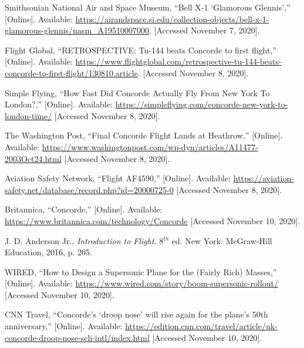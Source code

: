 \documentclass[a4paper,11pt]{article}
\begin{document}

\renewcommand{\bibname}{\begin{huge}References\end{huge}}
\begin{thebibliography}


{Smithsonian National Air and Space Museum},
{``Bell X-1 `Glamorous Glennis',''}
[Online]. Available:
\url{https://airandspace.si.edu/collection-objects/bell-x-1-glamorous-glennis/nasm_A19510007000}.
[Accessed November 7, 2020].

{Flight Global},
{``RETROSPECTIVE: Tu-144 beats Concorde to first flight,''}
[Online]. Available:
\url{https://www.flightglobal.com/retrospective-tu-144-beats-concorde-to-first-flight/130810.article}.
[Accessed November 8, 2020].

{Simple Flying},
{``How Fast Did Concorde Actually Fly From New York To London?,''}
[Online]. Available:
\url{https://simpleflying.com/concorde-new-york-to-london-time/}
[Accessed November 8, 2020].

{The Washington Post},
{``Final Concorde Flight Lands at Heathrow,''}
[Online]. Available:
\url{https://www.washingtonpost.com/wp-dyn/articles/A11477-2003Oct24.html}
[Accessed November 8, 2020].

{Aviation Safety Network},
{``Flight AF4590,''}
[Online]. Available:
\url{https://aviation-safety.net/database/record.php?id=20000725-0}
[Accessed November 8, 2020].

{Britannica},
{``Concorde,''}
[Online]. Available:
\url{https://www.britannica.com/technology/Concorde}
[Accessed November 10, 2020].

{J. D. Anderson Jr.},
\textit{Introduction to Flight}.
{8$^{th}$ ed. New York: McGraw-Hill Education, 2016, p. 205}.

{WIRED},
{``How to Design a Supersonic Plane for the (Fairly Rich) Masses,''}
[Online]. Available:
\url{https://www.wired.com/story/boom-supersonic-rollout/}
[Accessed November 10, 2020].

{CNN Travel},
{``Concorde's `droop nose' will rise again for the plane's 50th anniversary,''}
[Online]. Available:
\url{https://edition.cnn.com/travel/article/uk-concorde-droop-nose-scli-intl/index.html}
[Accessed November 10, 2020].


\end{thebibliography}
\end{document}
